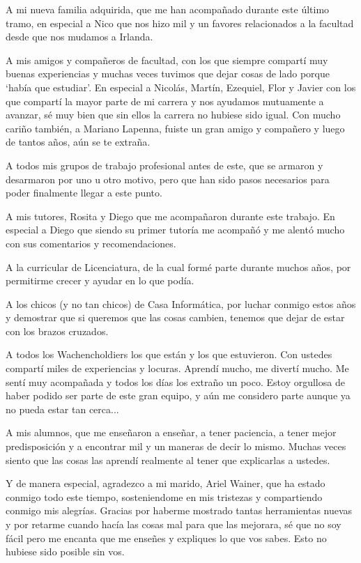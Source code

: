 \documentclass[a4paper]{article}
\begin{document}
A mi nueva familia adquirida, que me han acompañado durante este último tramo, en especial a Nico que nos hizo mil y un favores relacionados a la facultad desde que nos mudamos a Irlanda.

A mis amigos y compañeros de facultad, con los que siempre compartí muy buenas experiencias y muchas veces tuvimos que dejar cosas de lado porque `había que estudiar'. En especial a Nicolás, Martín, Ezequiel, Flor y Javier con los que compartí la mayor parte de mi carrera y nos ayudamos mutuamente a avanzar, sé muy bien que sin ellos la carrera no hubiese sido igual. Con mucho cariño también, a Mariano Lapenna, fuiste un gran amigo y compañero y luego de tantos años, aún se te extraña.

A todos mis grupos de trabajo profesional antes de este, que se armaron y desarmaron por uno u otro motivo, pero que han sido pasos necesarios para poder finalmente llegar a este punto.

A mis tutores, Rosita y Diego que me acompañaron durante este trabajo. En especial a Diego que siendo su primer tutoría me acompañó y me alentó mucho con sus comentarios y recomendaciones.

A la curricular de Licenciatura, de la cual formé parte durante muchos años, por permitirme crecer y ayudar en lo que podía.

A los chicos (y no tan chicos) de Casa Informática, por luchar conmigo estos años y demostrar que si queremos que las cosas cambien, tenemos que dejar de estar con los brazos cruzados.

A todos los Wachencholdiers los que están y los que estuvieron. Con ustedes compartí miles de experiencias y locuras. Aprendí mucho, me divertí mucho. Me sentí muy acompañada y todos los días los extraño un poco. Estoy orgullosa de haber podido ser parte de este gran equipo, y aún me considero parte aunque ya no pueda estar tan cerca...

A mis alumnos, que me enseñaron a enseñar, a tener paciencia, a tener mejor predisposición y a encontrar mil y un maneras de decir lo mismo. Muchas veces siento que las cosas las aprendí realmente al tener que explicarlas a ustedes.

Y de manera especial, agradezco a mi marido, Ariel Wainer, que ha estado conmigo todo este tiempo, sosteniendome en mis tristezas y compartiendo conmigo mis alegrías. Gracias por haberme mostrado tantas herramientas nuevas y por retarme cuando hacía las cosas mal para que las mejorara, sé que no soy fácil pero me encanta que me enseñes y expliques lo que vos sabes. Esto no hubiese sido posible sin vos.
\end{document}
